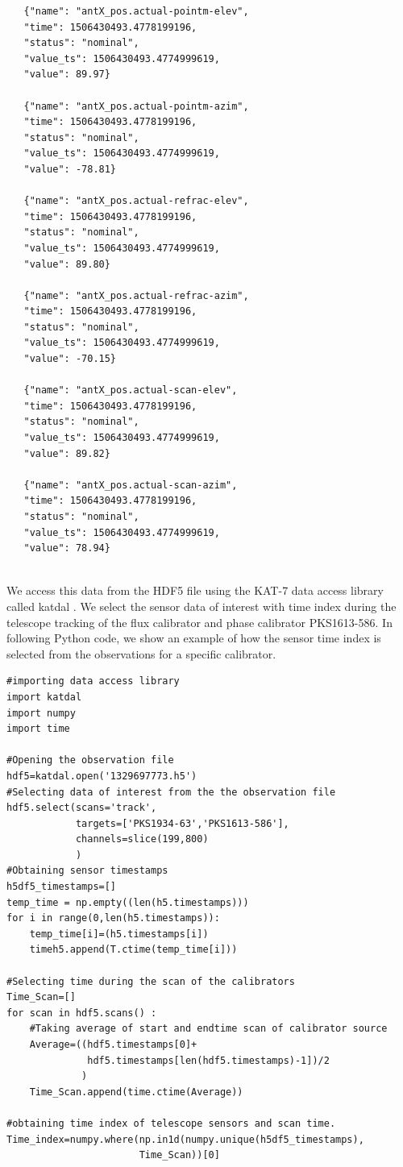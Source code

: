 \begin{tcolorbox}
\begin{lstlisting}
   {"name": "antX_pos.actual-pointm-elev",
   "time": 1506430493.4778199196,
   "status": "nominal",
   "value_ts": 1506430493.4774999619,
   "value": 89.97}
   
   {"name": "antX_pos.actual-pointm-azim",
   "time": 1506430493.4778199196,
   "status": "nominal",
   "value_ts": 1506430493.4774999619,
   "value": -78.81}
   
   {"name": "antX_pos.actual-refrac-elev",
   "time": 1506430493.4778199196,
   "status": "nominal",
   "value_ts": 1506430493.4774999619,
   "value": 89.80}
   
   {"name": "antX_pos.actual-refrac-azim",
   "time": 1506430493.4778199196,
   "status": "nominal",
   "value_ts": 1506430493.4774999619,
   "value": -70.15}
   
   {"name": "antX_pos.actual-scan-elev",
   "time": 1506430493.4778199196,
   "status": "nominal",
   "value_ts": 1506430493.4774999619,
   "value": 89.82}
   
   {"name": "antX_pos.actual-scan-azim",
   "time": 1506430493.4778199196,
   "status": "nominal",
   "value_ts": 1506430493.4774999619,
   "value": 78.94}
   
\end{lstlisting}
\end{tcolorbox}

We access this data from the HDF5 file using the KAT-7 data access library called katdal \citep{molenaar2017kern}. We select the sensor data of interest with time index during the telescope tracking of the flux calibrator and phase calibrator PKS1613-586. In following Python code, we show an example of how the sensor time index is selected from the observations for a specific calibrator.

\begin{tcolorbox}
\begin{lstlisting}
#importing data access library
import katdal
import numpy
import time

#Opening the observation file 
hdf5=katdal.open('1329697773.h5')
#Selecting data of interest from the the observation file
hdf5.select(scans='track',
            targets=['PKS1934-63','PKS1613-586'],
            channels=slice(199,800)
            )   
#Obtaining sensor timestamps            
h5df5_timestamps=[]
temp_time = np.empty((len(h5.timestamps)))
for i in range(0,len(h5.timestamps)):
    temp_time[i]=(h5.timestamps[i])
    timeh5.append(T.ctime(temp_time[i]))      
       
#Selecting time during the scan of the calibrators
Time_Scan=[]
for scan in hdf5.scans() :
    #Taking average of start and endtime scan of calibrator source
    Average=((hdf5.timestamps[0]+
              hdf5.timestamps[len(hdf5.timestamps)-1])/2
             ) 
    Time_Scan.append(time.ctime(Average))
    
#obtaining time index of telescope sensors and scan time.
Time_index=numpy.where(np.in1d(numpy.unique(h5df5_timestamps),
                       Time_Scan))[0]
\end{lstlisting}
\end{tcolorbox}

